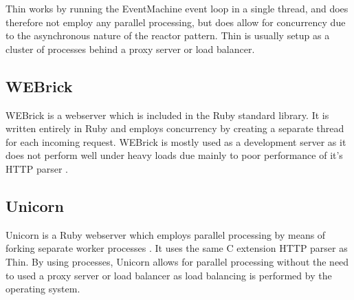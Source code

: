 Thin works by running the EventMachine event loop in a single thread, and
does therefore not employ any parallel processing, but does allow for
concurrency due to the asynchronous nature of the reactor pattern. Thin is
usually setup as a cluster of processes behind a proxy server or load
balancer.

\subsection{WEBrick}
WEBrick is a webserver which is included in the Ruby standard library. It is
written entirely in Ruby and employs concurrency by creating a separate thread
for each incoming request. WEBrick is mostly used as a development
server as it does not perform well under heavy loads due mainly to poor
performance of it's HTTP parser \cite{webrick}.

\subsection{Unicorn}
Unicorn is a Ruby webserver which employs parallel processing by means of
forking separate worker processes \cite{unicorndocs}. It uses the same
C extension HTTP parser as Thin. By using processes, Unicorn allows for parallel
processing without the need to used a proxy server or load balancer as load
balancing is performed by the operating system.

